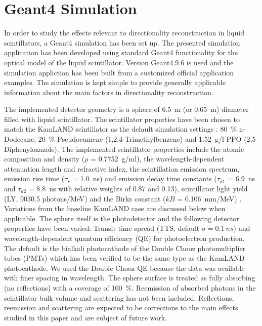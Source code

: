 \documentclass[aps,prc,twocolumn,groupedaddress,showpacs,amsmath,amssymb,floatfix,superscriptaddress]{revtex4}
\begin{document}
\section{Geant4 Simulation}
In order to study the effects relevant to directionality reconstruction in liquid scintillators, a Geant4 \cite{geant4one,geant4two} simulation has been set up. The presented simulation application has been developed using standard Geant4 functionality for the optical model of the liquid scintillator. Version Geant4.9.6 is used and the simulation appliction has been built from a customized official application examples. The simulation is kept simple to provide generally applicable information about the main factors in directionality reconstruction. 

The implemented detector geometry is a sphere of 6.5~m (or 0.65~m) diameter filled with liquid scintillator. The scintillator properties have been chosen to match the KamLAND scintillator as the default simulation settings \cite{tbd}: 80~\% n-Dodecane, 20~\% Pseudocumene (1,2,4-Trimethylbenzene) and 1.52~g/l PPO (2,5-Diphenyloxazole). The implemented scintillator properties include the atomic composition and density ($\rho$ = 0.7752~g/ml), the wavelength-dependent attenuation length and refractive index, the scintillation emission spectrum, emission rise time ($\tau_r$ = 1.0~ns) and emission decay time constants ($\tau_{d1}$ = 6.9~ns and $\tau_{d2}$ = 8.8~ns with relative weights of 0.87 and 0.13), scintillator light yield (LY, 9030.5 photons/MeV) and the Birks constant ($kB$ = 0.106~mm/MeV) \cite{tbd}. Variations from the baseline KamLAND case are discussed below when applicable. The sphere itself is the photodetector and the following detector properties have been varied: Transit time spread (TTS, default $\sigma = 0.1~ns$) and wavelength-dependent quantum efficiency (QE) for photoelectron production. The default is the bialkali photocathode of the Double Chooz photomultiplier tubes (PMTs) \cite{tbd} which has been verified to be the same type as the KamLAND photocathode. We used the Double Chooz QE because the data was available with finer spacing in wavelength. The sphere surface is treated as fully absorbing (no reflections) with a coverage of 100~\%. Reemission of absorbed photons in the scintillator bulk volume and scattering has not been included. Reflections, reemission and scattering are expected to be corrections to the main effects studied in this paper and are subject of future work. 
\end{document}
